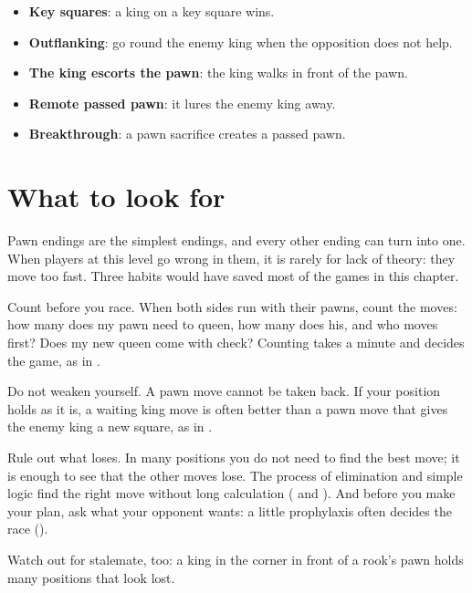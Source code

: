 \begin{itemize}
\item \textbf{Key squares}: a king on a key square wins.

\item \textbf{Outflanking}: go round the enemy king when the opposition does not help.

\item \textbf{The king escorts the pawn}: the king walks in front of the pawn.

\item \textbf{Remote passed pawn}: it lures the enemy king away.

\item \textbf{Breakthrough}: a pawn sacrifice creates a passed pawn.
\end{itemize}

\section*{What to look for}
Pawn endings are the simplest endings, and every other ending can turn into one. When players at
this level go wrong in them, it is rarely for lack of theory: they move too fast. Three habits would have saved most of the games
in this chapter.

Count before you race. When both sides run with their pawns, count the moves: how many does
my pawn need to queen, how many does his, and who moves first? Does my new queen come with check?
Counting takes a minute and decides the game, as in
.

Do not weaken yourself. A pawn move cannot be taken back. If your position holds as it is,
a waiting king move is often better than a pawn move that gives the enemy king a new
square, as in .

Rule out what loses. In many positions you do not need to find the best move; it is enough to
see that the other moves lose. The process of elimination
and simple logic find the right move without long calculation
( and ). And before you make your plan,
ask what your opponent wants: a little prophylaxis often decides the race
().

Watch out for stalemate, too: a king in the corner in front of a rook's pawn holds many positions
that look lost.

